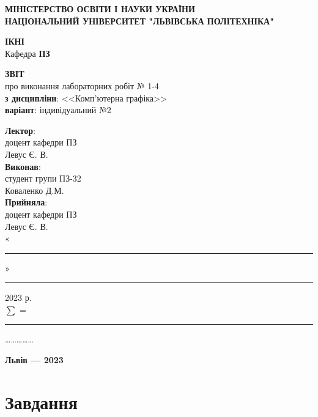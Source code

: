 \documentclass[oneside,14pt]{extarticle}
\newcommand\subject{Комп'ютерна графіка}
\newcommand\lecturer{доцент кафедри ПЗ \\ Левус Є. В.}
\newcommand\teacher{доцент кафедри ПЗ \\ Левус Є. В.}
\newcommand\mygroup{ПЗ-32}
\newcommand\lab{1-4}
\begin{document}
\begin{normalsize}
	\begin{titlepage}
		\thispagestyle{empty}
		\begin{center}
			\textbf{МІНІСТЕРСТВО ОСВІТИ І НАУКИ УКРАЇНИ\\
				НАЦІОНАЛЬНИЙ УНІВЕРСИТЕТ "ЛЬВІВСЬКА ПОЛІТЕХНІКА"}
		\end{center}
		\begin{flushright}
			\textbf{ІКНІ}\\
			Кафедра \textbf{ПЗ}
		\end{flushright}
		\vspace{70pt}
		\begin{center}
			\textbf{ЗВІТ}\\
			про виконання лабораторних робіт № \lab\\
			\textbf{з дисципліни}: <<\subject>>\\
			\textbf{варіант}:  індивідуальний №2
		\end{center}
		\vspace{50pt}
		\begin{flushright}
			
			\textbf{Лектор}:\\
			\lecturer\\
			\vspace{10pt}
			\textbf{Виконав}:\\
			
			студент групи \mygroup\\
			Коваленко Д.М.\\
			\vspace{10pt}
			\textbf{Прийняла}:\\
			
			\teacher\\
			
			\vspace{28pt}
			«\rule{1cm}{0.15mm}» \rule{1.5cm}{0.15mm} 2023 р.\\
			$\sum$ = \rule{1cm}{0.15mm}……………\\
			
		\end{flushright}
		\vspace{\fill}
		\begin{center}
			\textbf{Львів — 2023}
		\end{center}
	\end{titlepage}

	\tableofcontents
	\pagebreak
	
	\section{Завдання}

\end{normalsize}
\end{document}
